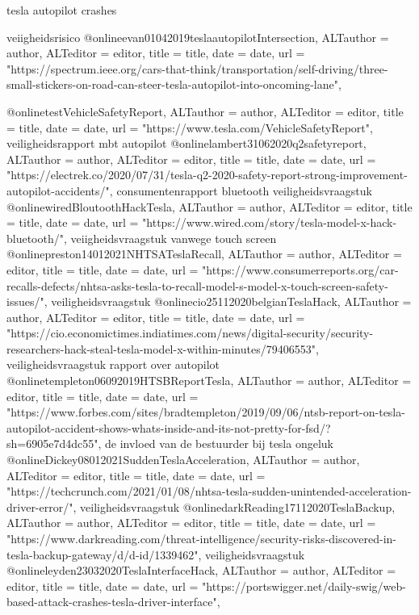 {{{tesla autopilot crashes


veiigheidsrisico
@online{evan01042019teslaautopilotIntersection,	ALTauthor = {author},	ALTeditor = {editor},	title = {title},	date = {date},	url = {"https://spectrum.ieee.org/cars-that-think/transportation/self-driving/three-small-stickers-on-road-can-steer-tesla-autopilot-into-oncoming-lane"},}

@online{testVehicleSafetyReport,	ALTauthor = {author},	ALTeditor = {editor},	title = {title},	date = {date},	url = {"https://www.tesla.com/VehicleSafetyReport"},}
veiligheidsrapport mbt autopilot
@online{lambert31062020q2safetyreport,	ALTauthor = {author},	ALTeditor = {editor},	title = {title},	date = {date},	url = {"https://electrek.co/2020/07/31/tesla-q2-2020-safety-report-strong-improvement-autopilot-accidents/"},}
consumentenrapport
bluetooth veiligheidsvraagstuk
@online{wiredBloutoothHackTesla,	ALTauthor = {author},	ALTeditor = {editor},	title = {title},	date = {date},	url = {"https://www.wired.com/story/tesla-model-x-hack-bluetooth/"},}
veiigheidsvraagstuk vanwege touch screen
@online{preston14012021NHTSATeslaRecall,	ALTauthor = {author},	ALTeditor = {editor},	title = {title},	date = {date},	url = {"https://www.consumerreports.org/car-recalls-defects/nhtsa-asks-tesla-to-recall-model-s-model-x-touch-screen-safety-issues/"},}
veiligheidsvraagstuk
@online{cio25112020belgianTeslaHack,	ALTauthor = {author},	ALTeditor = {editor},	title = {title},	date = {date},	url = {"https://cio.economictimes.indiatimes.com/news/digital-security/security-researchers-hack-steal-tesla-model-x-within-minutes/79406553"},}
veiligheidsvraagstuk
rapport over autopilot
@online{templeton06092019HTSBReportTesla,	ALTauthor = {author},	ALTeditor = {editor},	title = {title},	date = {date},	url = {"https://www.forbes.com/sites/bradtempleton/2019/09/06/ntsb-report-on-tesla-autopilot-accident-shows-whats-inside-and-its-not-pretty-for-fsd/?sh=6905e7d4dc55"},}
de invloed van de bestuurder bij tesla ongeluk
@online{Dickey08012021SuddenTeslaAcceleration,	ALTauthor = {author},	ALTeditor = {editor},	title = {title},	date = {date},	url = {"https://techcrunch.com/2021/01/08/nhtsa-tesla-sudden-unintended-acceleration-driver-error/"},}
veiligheidsvraagstuk
@online{darkReading17112020TeslaBackup,	ALTauthor = {author},	ALTeditor = {editor},	title = {title},	date = {date},	url = {"https://www.darkreading.com/threat-intelligence/security-risks-discovered-in-tesla-backup-gateway/d/d-id/1339462"},}
veiligheidsvraagstuk
@online{leyden23032020TeslaInterfaceHack,	ALTauthor = {author},	ALTeditor = {editor},	title = {title},	date = {date},	url = {"https://portswigger.net/daily-swig/web-based-attack-crashes-tesla-driver-interface"},}
}}}
